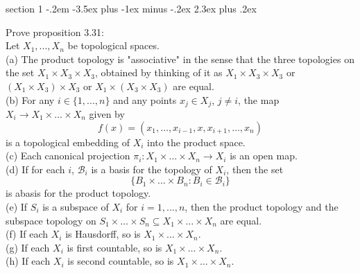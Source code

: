 \documentclass[12pt]{article}
\makeatletter
\newenvironment{p}{\@startsection
       {section}
       {1}
       {-.2em}
       {-3.5ex plus -1ex minus -.2ex}
       {2.3ex plus .2ex}
       {\pagebreak[3]%
       \large\bf\noindent{P }
       }
       }
\makeatother
\begin{document}
\begin{p}{3.32}
    Prove proposition 3.31:\\
    Let $X_1,...,X_n$ be topological spaces.\\
    (a) The product topology is "associative" in the sense that the three topologies on the set  
    $X_1\times X_3 \times X_3$, obtained by thinking of it as 
    $X_1\times X_3 \times X_3$ or $(X_1\times X_3) \times X_3$ or $X_1\times (X_3 \times X_3)$
    are equal.\\
    (b) For any $i\in \{1,...,n\}$ and any points $x_j \in X_j$, $j \ne i$, the map 
    $X_i \to X_1 \times \dots \times X_n$ given by 
    $$f(x) = (x_1,\dots,x_{i-1},x,x_{i+1},\dots,x_n)$$
    is a topological embedding of $X_i$ into the product space.\\
    (c) Each canonical projection $\pi_i: X_1 \times \dots \times X_n \to X_i$ is an open map.\\
    (d) If for each $i$, $\mathscr{B}_i$ is a basis for the topology of $X_i$, then the set
    $$\{B_1 \times \dots \times B_n : B_i \in \mathscr{B}_i\}$$
    is abasis for the product topology.\\
    (e) If $S_i$ is a subspace of $X_i$ for $i=1,\dots ,n$, then the product topology and the subspace topology
    on $S_1 \times \dots \times S_n \subseteq X_1 \times \dots \times X_n$ are equal.\\
    (f) If each $X_i$ is Hausdorff, so is $X_1 \times \dots \times X_n$.\\
    (g) If each $X_i$ is first countable, so is $X_1 \times \dots \times X_n$.\\
    (h) If each $X_i$ is second countable, so is $X_1 \times \dots \times X_n$.
\end{p}
\end{document}
